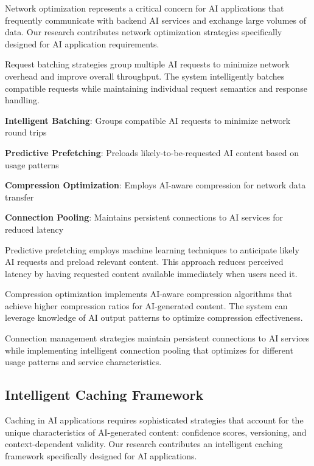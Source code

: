 Network optimization represents a critical concern for AI applications that frequently communicate with backend AI services and exchange large volumes of data. Our research contributes network optimization strategies specifically designed for AI application requirements.

Request batching strategies group multiple AI requests to minimize network overhead and improve overall throughput. The system intelligently batches compatible requests while maintaining individual request semantics and response handling.

\begin{expandedlist}
    \item \textbf{Intelligent Batching}: Groups compatible AI requests to minimize network round trips
    \item \textbf{Predictive Prefetching}: Preloads likely-to-be-requested AI content based on usage patterns
    \item \textbf{Compression Optimization}: Employs AI-aware compression for network data transfer
    \item \textbf{Connection Pooling}: Maintains persistent connections to AI services for reduced latency
\end{expandedlist}

Predictive prefetching employs machine learning techniques to anticipate likely AI requests and preload relevant content. This approach reduces perceived latency by having requested content available immediately when users need it.

Compression optimization implements AI-aware compression algorithms that achieve higher compression ratios for AI-generated content. The system can leverage knowledge of AI output patterns to optimize compression effectiveness.

Connection management strategies maintain persistent connections to AI services while implementing intelligent connection pooling that optimizes for different usage patterns and service characteristics.

\subsection*{Intelligent Caching Framework}

Caching in AI applications requires sophisticated strategies that account for the unique characteristics of AI-generated content: confidence scores, versioning, and context-dependent validity. Our research contributes an intelligent caching framework specifically designed for AI applications.

